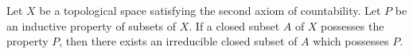Let $X$ be a topological space satisfying the second axiom of countability. Let $P$ be an inductive property of subsets of $X$. If a closed subset $A$ of $X$ possesses the property $P$, then there exists an irreducible closed subset of $A$ which possesses $P$.
